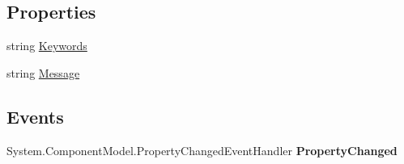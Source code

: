 \subsection*{Properties}
\begin{DoxyCompactItemize}
\item 
\hypertarget{class_price___comparison_1_1amazon_1_1ecs_1_1_corrected_query_a81caac3cd55e6febd1d81e83834b498f}{string \hyperlink{class_price___comparison_1_1amazon_1_1ecs_1_1_corrected_query_a81caac3cd55e6febd1d81e83834b498f}{Keywords}}\label{class_price___comparison_1_1amazon_1_1ecs_1_1_corrected_query_a81caac3cd55e6febd1d81e83834b498f}

\begin{DoxyCompactList}\small\item\em \end{DoxyCompactList}\item 
\hypertarget{class_price___comparison_1_1amazon_1_1ecs_1_1_corrected_query_a4dc1655c0295ac7e9c3cdb20b924d5d7}{string \hyperlink{class_price___comparison_1_1amazon_1_1ecs_1_1_corrected_query_a4dc1655c0295ac7e9c3cdb20b924d5d7}{Message}}\label{class_price___comparison_1_1amazon_1_1ecs_1_1_corrected_query_a4dc1655c0295ac7e9c3cdb20b924d5d7}

\begin{DoxyCompactList}\small\item\em \end{DoxyCompactList}\end{DoxyCompactItemize}
\subsection*{Events}
\begin{DoxyCompactItemize}
\item 
\hypertarget{class_price___comparison_1_1amazon_1_1ecs_1_1_corrected_query_a5caa0cc5a2feee8670d4ec48e38d7694}{System.\-Component\-Model.\-Property\-Changed\-Event\-Handler {\bfseries Property\-Changed}}\label{class_price___comparison_1_1amazon_1_1ecs_1_1_corrected_query_a5caa0cc5a2feee8670d4ec48e38d7694}

\end{DoxyCompactItemize}
